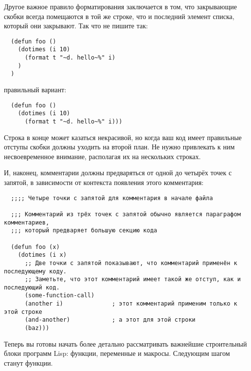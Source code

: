 Другое важное правило форматирования заключается в том, что закрывающие скобки всегда
помещаются в той же строке, что и последний элемент списка, который они закрывают. Так что
не пишите так:

\begin{lstlisting}
  (defun foo ()
    (dotimes (i 10)
      (format t "~d. hello~%" i)
    )
  )
\end{lstlisting}

правильный вариант:

\begin{lstlisting}
  (defun foo ()
    (dotimes (i 10)
      (format t "~d. hello~%" i)))
\end{lstlisting}

Строка \code{)))} в конце может казаться некрасивой, но когда ваш код имеет правильные
отступы скобки должны уходить на второй план. Не нужно привлекать к ним несвоевременное
внимание, располагая их на нескольких строках.

И, наконец, комментарии должны предваряться от одной до четырёх точек с запятой, в
зависимости от контекста появления этого комментария:

\begin{lstlisting}
  ;;;; Четыре точки с запятой для комментария в начале файла

  ;;; Комментарий из трёх точек с запятой обычно является параграфом комментариев,
  ;;; который предваряет большую секцию кода

  (defun foo (x)
    (dotimes (i x)
      ;; Две точки с запятой показывают, что комментарий применён к последующему коду.
      ;; Заметьте, что этот комментарий имеет такой же отступ, как и последующий код.
      (some-function-call)
      (another i)              ; этот комментарий применим только к этой строке
      (and-another)            ; а этот для этой строки
      (baz)))
\end{lstlisting}

Теперь вы готовы начать более детально рассматривать важнейшие строительный блоки программ
Lisp: функции, переменные и макросы. Следующим шагом станут функции.

